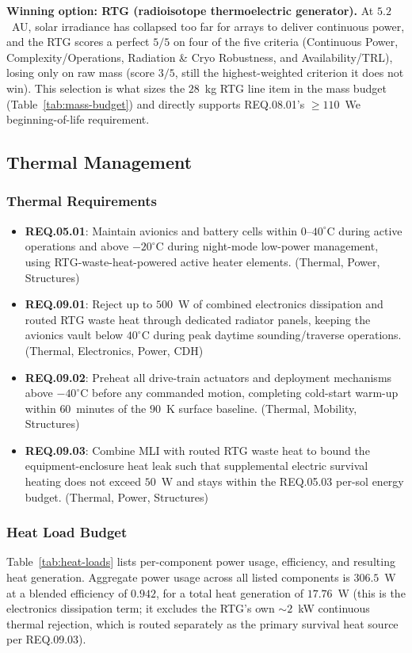 \documentclass[11pt]{article}
\newcommand{\reqid}[1]{\textbf{#1}}
\begin{document}
\textbf{Winning option: RTG (radioisotope thermoelectric generator).} At $5.2$~AU,
solar irradiance has collapsed too far for arrays to deliver continuous power, and the RTG
scores a perfect $5/5$ on four of the five criteria (Continuous Power, Complexity/Operations,
Radiation \& Cryo Robustness, and Availability/TRL), losing only on raw mass (score $3/5$,
still the highest-weighted criterion it does not win). This selection is what sizes the $28$~kg
RTG line item in the mass budget (Table~\ref{tab:mass-budget}) and directly supports REQ.08.01's
$\geq 110$~We beginning-of-life requirement.

\subsection{Thermal Management}

\subsubsection{Thermal Requirements}
\begin{itemize}[leftmargin=*]
    \item \reqid{REQ.05.01}: Maintain avionics and battery cells within $0$--$40^\circ$C
    during active operations and above $-20^\circ$C during night-mode low-power management,
    using RTG-waste-heat-powered active heater elements. (Thermal, Power, Structures)
    \item \reqid{REQ.09.01}: Reject up to $500$~W of combined electronics dissipation and
    routed RTG waste heat through dedicated radiator panels, keeping the avionics vault below
    $40^\circ$C during peak daytime sounding/traverse operations. (Thermal, Electronics, Power,
    CDH)
    \item \reqid{REQ.09.02}: Preheat all drive-train actuators and deployment mechanisms
    above $-40^\circ$C before any commanded motion, completing cold-start warm-up within
    $60$~minutes of the $90$~K surface baseline. (Thermal, Mobility, Structures)
    \item \reqid{REQ.09.03}: Combine MLI with routed RTG waste heat to bound the
    equipment-enclosure heat leak such that supplemental electric survival heating does not
    exceed $50$~W and stays within the REQ.05.03 per-sol energy budget. (Thermal, Power,
    Structures)
\end{itemize}

\subsubsection{Heat Load Budget}
Table~\ref{tab:heat-loads} lists per-component power usage, efficiency, and resulting heat
generation. Aggregate power usage across all listed components is $306.5$~W at a blended
efficiency of $0.942$, for a total heat generation of $17.76$~W (this is the electronics
dissipation term; it excludes the RTG's own $\sim 2$~kW continuous thermal rejection, which is
routed separately as the primary survival heat source per REQ.09.03).
\end{document}
